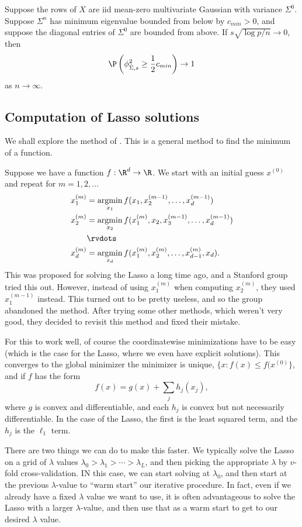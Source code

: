 \documentclass[a4paper]{article}
\DeclareMathOperator*\argmin{argmin}
\begin{document}
\begin{cor}
  Suppose the rows of $X$ are iid mean-zero multivariate Gaussian with variance $\Sigma^0$. Suppose $\Sigma^n$ has minimum eigenvalue bounded from below by $c_{min} > 0$, and suppose the diagonal entries of $\Sigma^0$ are bounded from above. If $s \sqrt{\log p / n} \to 0$, then
  \[
    \P\left(\phi_{\hat{\Sigma}, s}^2 \geq \frac{1}{2} c_{min}\right) \to 1
  \]
  as $n \to \infty$.
\end{cor}

\subsection{Computation of Lasso solutions}
We shall explore the method of . This is a general method to find the minimum of a function.

Suppose we have a function $f: \R^d \to \R$. We start with an initial guess $x^{(0)}$ and repeat for $m = 1, 2, \ldots$
\begin{align*}
  x_1^{(m)} &= \argmin_{x_1} f(x_1, x_2^{(m - 1)}, \ldots, x_d^{(m - 1)})\\
  x_2^{(m)} &= \argmin_{x_2} f(x_1^{(m)}, x_2, x_3^{(m - 1)}, \ldots, x_d^{(m - 1)})\\
  &\rvdots\\
  x_d^{(m)} &= \argmin_{x_d} f(x_1^{(m)}, x_2^{(m)}, \ldots, x_{d - 1}^{(m)}, x_d).
\end{align*}
This was proposed for solving the Lasso a long time ago, and a Stanford group tried this out. However, instead of using $x_1^{(m)}$ when computing $x_2^{(m)}$, they used $x^{(m - 1)}_1$ instead. This turned out to be pretty useless, and so the group abandoned the method. After trying some other methods, which weren't very good, they decided to revisit this method and fixed their mistake.

For this to work well, of course the coordinatewise minimizations have to be easy (which is the case for the Lasso, where we even have explicit solutions). This converges to the global minimizer the minimizer is unique, $\{x : f(x) \leq f(x^{(0)}\}$, and if $f$ has the form
\[
  f(x) = g(x) + \sum_j h_j(x_j),
\]
where $g$ is convex and differentiable, and each $h_j$ is convex but not necessarily differentiable. In the case of the Lasso, the first is the least squared term, and the $h_j$ is the $\ell_1$ term.

There are two things we can do to make this faster. We typically solve the Lasso on a grid of $\lambda$ values $\lambda_0 > \lambda_1 > \cdots > \lambda_L$, and then picking the appropriate $\lambda$ by $v$-fold cross-validation. IN this case, we can start solving at $\lambda_0$, and then start at the previous $\lambda$-value to ``warm start'' our iterative procedure. In fact, even if we already have a fixed $\lambda$ value we want to use, it is often advantageous to solve the Lasso with a larger $\lambda$-value, and then use that as a warm start to get to our desired $\lambda$ value. 
\end{document}

